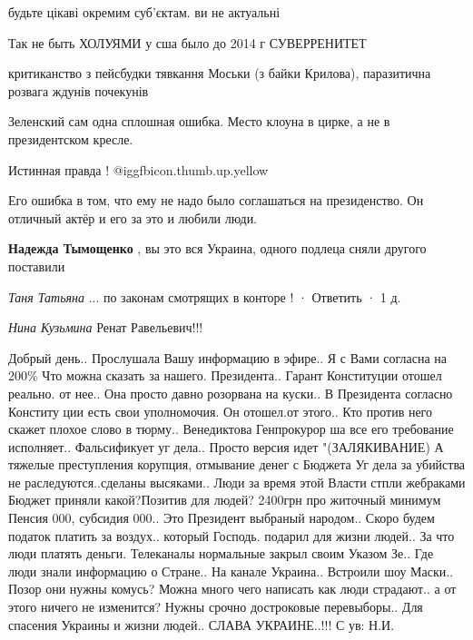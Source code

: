 \begin{itemize}
будьте цікаві окремим суб'єктам. ви не актуальні

Так не быть ХОЛУЯМИ у сша было до 2014 г СУВЕРРЕНИТЕТ

критиканство з пейсбудки тявкання Моськи (з байки Крилова), паразитична розвага ждунів почекунів

Зеленский сам одна сплошная ошибка. Место клоуна в цирке, а не в президентском кресле.

Истинная правда ! @igg{fbicon.thumb.up.yellow} 


Его ошибка в том, что ему не надо было соглашаться на президенство. Он отличный
актёр и его за это и любили люди.

\begin{itemize} %
\textbf{Надежда Тымощенко} , вы это вся Украина, одного подлеца сняли другого поставили
\end{itemize} %

\emph{Таня Татьяна}
... по законам смотрящих в конторе !
 · Ответить · 1 д.

\emph{Нина Кузьмина}
Ренат Равельевич!!!

Добрый день.. Прослушала Вашу информацию в эфире.. Я с Вами согласна на 200\%
Что можна сказать за нашего. Президента.. Гарант Конституции отошел реально.
от нее.. Она просто давно розорвана на куски.. В Президента согласно Конститу
ции есть свои уполномочия. Он отошел.от этого.. Кто против него скажет плохое
слово в тюрму.. Венедиктова Генпрокурор ша все его требование исполняет..
Фальсификует уг дела..  Просто версия идет "(ЗАЛЯКИВАНИЕ) А тяжелые
преступления корупция, отмывание денег с Бюджета Уг дела за убийства не
раследуются..сделаны высяками..  Люди за время этой Власти стпли жебраками
Бюджет приняли какой?Позитив для людей? 2400грн про житочный минимум Пенсия
000, субсидия 000.. Это Президент выбраный народом..  Скоро будем податок
платить за воздух.. который Господь. подарил для жизни людей..  За что люди
платять деньги. Телеканалы нормальные закрыл своим Указом Зе.. Где люди знали
информацию о Стране.. На канале Украина.. Встроили шоу Маски.. Позор они нужны
комусь?  Можна много чего написать как люди страдают.. а от этого ничего не
изменится? Нужны срочно достроковые перевыборы..  Для спасения Украины и жизни
людей..  СЛАВА УКРАИНЕ..!!!  С ув: Н.И.


\end{itemize} %
